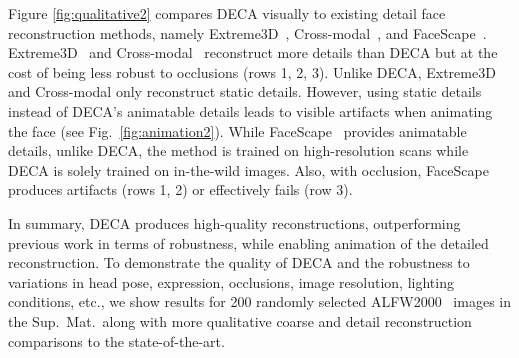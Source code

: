 \documentclass[final]{cvpr}
\newcommand{\modelname}{DECA\xspace}
\newcommand{\supmat}{Sup.~Mat.\xspace}
\begin{document}
Figure \ref{fig:qualitative2} compares \modelname visually to existing detail face reconstruction methods, namely Extreme3D~\cite{AnhTran2018}, Cross-modal~\cite{Abrevaya2020}, and FaceScape~\cite{yang2020facescape}.
Extreme3D~\cite{AnhTran2018} and Cross-modal~\cite{Abrevaya2020} reconstruct more details than \modelname but at the cost of being less robust to occlusions (rows 1, 2, 3).
Unlike \modelname, Extreme3D and Cross-modal only reconstruct static details. 
However, using static details instead of \modelname's animatable details leads to visible artifacts when animating the face (see Fig.~\ref{fig:animation2}).
While FaceScape~\cite{yang2020facescape} provides animatable details, unlike \modelname, the method is trained on high-resolution scans while \modelname is solely trained on in-the-wild images.
Also, with occlusion, FaceScape produces artifacts (rows 1, 2) or effectively fails (row 3).

In summary, \modelname produces high-quality reconstructions, outperforming previous work in terms of robustness, while enabling animation of the detailed reconstruction.
To demonstrate the quality of \modelname and the robustness to variations in head pose, expression, occlusions, image resolution, lighting conditions, etc., we show results for 200 randomly selected ALFW2000~\cite{Zhu2015} images in the \supmat~along with more qualitative coarse and detail reconstruction comparisons to the state-of-the-art.
\end{document}
